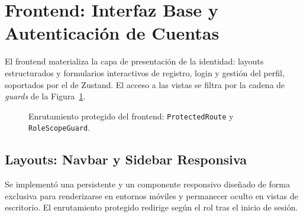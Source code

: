 \section{Frontend: Interfaz Base y Autenticación de Cuentas}
\label{sec:s1_frontend}

El frontend materializa la capa de presentación de la identidad: layouts estructurados y
formularios interactivos de registro, login y gestión del perfil, soportados por el
 de Zustand. El acceso a las vistas se filtra por la cadena de
\textit{guards} de la Figura~\ref{fig:s1_guards}.\par

\begin{figure}[!ht]
    \centering
    \caption{Enrutamiento protegido del frontend: \texttt{ProtectedRoute} y \texttt{RoleScopeGuard}.}
    \label{fig:s1_guards}
\end{figure}

\subsection{Layouts: Navbar y Sidebar Responsiva}
\label{ssec:s1_fe_layouts}
Se implementó una  persistente y un componente  responsivo
diseñado de forma exclusiva para renderizarse en entornos móviles y permanecer oculto en vistas
de escritorio. El enrutamiento protegido redirige según el rol tras el inicio de sesión.

